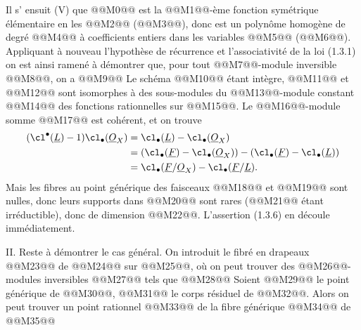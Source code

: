 
Il s'%
ensuit (V) que @@M0@@ est la @@M1@@-ème fonction symétrique élémentaire en les @@M2@@ (@@M3@@), donc est un polynôme homogène de degré @@M4@@ à coefficients entiers dans les variables @@M5@@ (@@M6@@). Appliquant à nouveau l'hypothèse de récurrence et l'associativité de la loi (1.3.1) on est ainsi ramené à démontrer que, pour tout @@M7@@-module inversible @@M8@@, on a
@@M9@@
Le schéma @@M10@@ étant intègre, @@M11@@ et @@M12@@ sont isomorphes à des sous-modules du @@M13@@-module constant @@M14@@ des fonctions rationnelles sur @@M15@@. Le @@M16@@-module somme @@M17@@ est cohérent, et on trouve
\begin{align*}
(\cl^{\bullet}(\underline{L})-1)\cl_\bullet(\underline{O}_X)
&=\cl_\bullet(\underline{L})-\cl_\bullet(\underline{O}_X)\\
&=(\cl_\bullet(\underline{F})-\cl_\bullet(\underline{O}_X))-(\cl_\bullet(\underline{F})-\cl_\bullet(\underline{L}))\\
&=\cl_\bullet(\underline{F}/\underline{O}_X)-\cl_\bullet(\underline{F}/\underline{L}).
\end{align*}
Mais les fibres au point générique des faisceaux @@M18@@ et @@M19@@ sont nulles, donc leurs supports dans @@M20@@ sont rares (@@M21@@ étant irréductible), donc de dimension @@M22@@. L'assertion (1.3.6) en découle immédiatement.

II. Reste à démontrer le cas général. On introduit le fibré en drapeaux
@@M23@@
de @@M24@@ sur @@M25@@, où on peut trouver des @@M26@@-modules inversibles @@M27@@ tels que
@@M28@@
Soient @@M29@@ le point générique de @@M30@@, @@M31@@ le corps résiduel de @@M32@@. Alors on peut trouver un point rationnel @@M33@@ de la fibre générique @@M34@@ de @@M35@@ 
